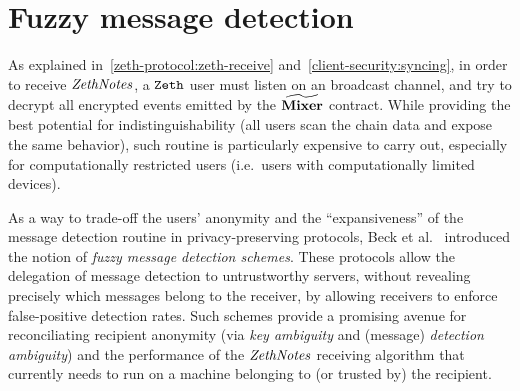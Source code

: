 
\chapter{Fuzzy message detection}\label{appendix:fmd}

As explained in~\ref{zeth-protocol:zeth-receive} and~\ref{client-security:syncing}, in order to receive $\mathit{ZethNotes}$, a $\texttt{Zeth}$ user must listen on an broadcast channel, and try to decrypt all encrypted events emitted by the $\widetilde{\mathbf{Mixer}}$ contract. While providing the best potential for indistinguishability (all users scan the chain data and expose the same behavior), such routine is particularly expensive to carry out, especially for computationally restricted users (i.e.~users with computationally limited devices).

As a way to trade-off the users' anonymity and the ``expansiveness'' of the message detection routine in privacy-preserving protocols, Beck et al.~\cite{DBLP:journals/iacr/BeckLMG21} introduced the notion of \emph{fuzzy message detection schemes}. These protocols allow the delegation of message detection to untrustworthy servers, without revealing precisely which messages belong to the receiver, by allowing receivers to enforce false-positive detection rates.
Such schemes provide a promising avenue for reconciliating recipient anonymity (via \emph{key ambiguity} and (message) \emph{detection ambiguity}) and the performance of the $\mathit{ZethNotes}$ receiving algorithm that currently needs to run on a machine belonging to (or trusted by) the recipient.

